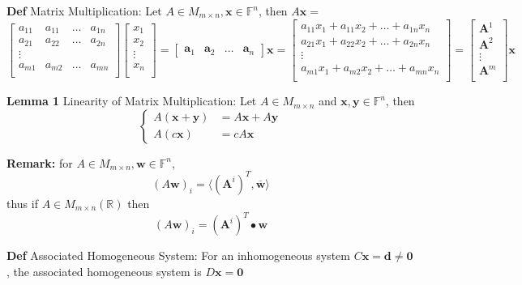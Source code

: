 \documentclass[11pt,notitlepage]{report}
\newcommand{\bb}[1]{\ensuremath{\mathbb{#1}}}
\newcommand{\tbf}[1]{\textbf{#1}}
\begin{document}
\textbf{Def} Matrix Multiplication: Let $A \in M_{m\times n}, \tbf x \in \bb F^n$, then $A\tbf x =$
$$\begin{bmatrix}
a_{11} & a_{11} & \dots & a_{1n}\\
a_{21} & a_{22} & \dots & a_{2n}\\
\vdots\\
a_{m1} & a_{m2} & \dots & a_{mn}\\
\end{bmatrix}\begin{bmatrix}
x_1\\
x_2\\
\vdots\\
x_n\\
\end{bmatrix} = \begin{bmatrix}
\tbf a_{1} & \tbf a_{2} & \dots & \tbf a_{n}\end{bmatrix}\tbf x = \begin{bmatrix}
a_{11}x_1 + a_{11}x_2 + \dots + a_{1n}x_n\\
a_{21}x_1 + a_{22}x_2 + \dots + a_{2n}x_n\\
\vdots\\
a_{m1}x_1 + a_{m2}x_2 + \dots + a_{mn}x_n\\
\end{bmatrix} = \begin{bmatrix}
\tbf A^1\\
\tbf A^2\\
\vdots\\
\tbf A^m\\
\end{bmatrix}\tbf x$$


\textbf{Lemma 1} Linearity of Matrix Multiplication: Let $A \in M_{m \times n}$ and $\tbf x, \tbf y \in \bb F^n$, then
$$\begin{cases}
A(\tbf x + \tbf y) &= A\tbf x + A\tbf y\\
A(c\tbf x) &=  cA \tbf x
\end{cases}$$

\textbf{Remark: }for $A \in M_{m \times n}, \tbf w \in \bb F^n$,
$$(A\tbf w)_i = \langle (\tbf A^i)^T, \overline{\tbf{w}} \rangle$$
thus if $A \in M_{m \times n}(\bb R)$ then
$$(A\tbf w)_i = (\tbf A^i)^T \bullet \tbf w$$



\textbf{Def} Associated Homogeneous System: For an inhomogeneous system $C\tbf x = \tbf d \ne \tbf 0$, the associated homogeneous system is $D\tbf x = \tbf 0$
\end{document}
